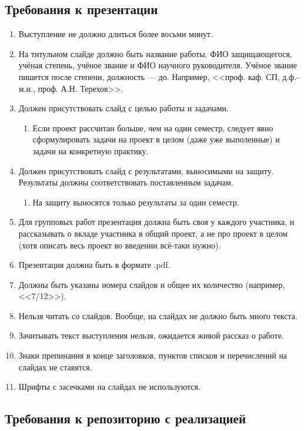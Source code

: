 \documentclass{article}
\begin{document}
\subsection{Требования к презентации}

\begin{enumerate}
    \item Выступление не должно длиться более восьми минут.
    \item На титульном слайде должно быть название работы, ФИО защищающегося, учёная степень, учёное звание и ФИО научного руководителя. Учёное звание пишется после степени, должность --- до. Например, <<проф. каф. СП, д.ф.-м.н., проф. А.Н. Терехов>>.
    \item Должен присутствовать слайд с целью работы и задачами.
    \begin{enumerate}
        \item Если проект рассчитан больше, чем на один семестр, следует явно сформулировать задачи на проект в целом (даже уже выполенные) и задачи на конкретную практику.
    \end{enumerate}
    \item Должен присутствовать слайд с результатами, выносимыми на защиту. Результаты должны соответствовать поставленным задачам.
    \begin{enumerate}
        \item На защиту выносятся только результаты за один семестр.
    \end{enumerate}
    \item Для групповых работ презентация должна быть своя у каждого участника, и рассказывать о вкладе участника в общий проект, а не про проект в целом (хотя описать весь проект во введении всё-таки нужно).
    \item Презентация должна быть в формате .pdf.
    \item Должны быть указаны номера слайдов и общее их количество (например, <<7/12>>).
    \item Нельзя читать со слайдов. Вообще, на слайдах не должно быть много текста.
    \item Зачитывать текст выступления нельзя, ожидается живой рассказ о работе.
    \item Знаки препинания в конце заголовков, пунктов списков и перечислений на слайдах не ставятся.
    \item Шрифты с засечками на слайдах не используются.
\end{enumerate}

\subsection{Требования к репозиторию с реализацией}
\end{document}
